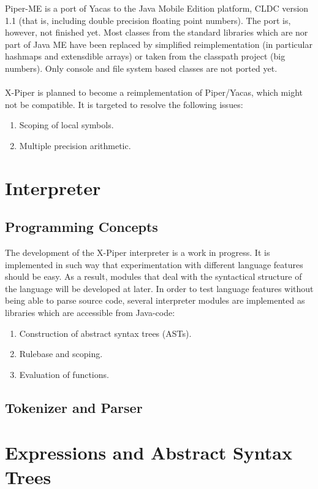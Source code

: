 Piper-ME is a port of Yacas to the Java Mobile Edition platform, CLDC version 1.1 
(that is, including double precision floating point numbers). The port is, however,
not finished yet. Most classes from the standard libraries which are nor part of
Java ME have been replaced by simplified reimplementation (in particular hashmaps
and extensdible arrays) or taken from the classpath project (big numbers). Only
console and file system based classes are not ported yet.\\
\\
X-Piper is planned to become a reimplementation of Piper/Yacas, which might
not be compatible. It is targeted to resolve the following issues:
\begin{enumerate}
\item Scoping of local symbols.
\item Multiple precision arithmetic.
\end{enumerate}

\chapter{Interpreter}

\section{Programming Concepts}

The development of the X-Piper interpreter is a work in progress. It is implemented
in such way that experimentation with different language features should be easy.
As a result, modules that deal with the syntactical structure of the language will
be developed at later. In order to test language features without being able to
parse source code, several interpreter modules are implemented as libraries which
are accessible from Java-code:
\begin{enumerate}
\item Construction of abstract syntax trees (ASTs).
\item Rulebase and scoping.
\item Evaluation of functions.
\end{enumerate}

\section{Tokenizer and Parser}

\chapter{Expressions and Abstract Syntax Trees}

